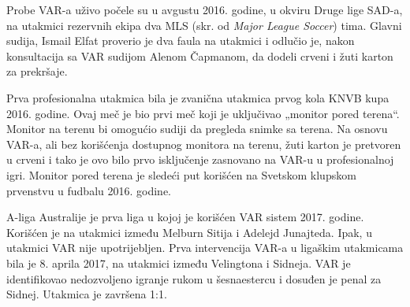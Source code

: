 \documentclass[a4paper]{article}
\begin{document}
Probe VAR-a uživo počele su u avgustu 2016. godine, u okviru Druge lige SAD-a, na utakmici rezervnih ekipa dva MLS (skr. od \emph{Major League Soccer}) tima. Glavni sudija, Ismail Elfat proverio je dva faula na utakmici i odlučio je, nakon konsultacija sa VAR sudijom Alenom Čapmanom, da dodeli crveni i žuti karton za prekršaje.

Prva profesionalna utakmica bila je zvanična utakmica prvog kola KNVB kupa 2016. godine. Ovaj meč je bio prvi meč koji je uključivao „monitor pored terena“. Monitor na terenu bi omogućio sudiji da pregleda snimke sa terena. Na osnovu VAR-a, ali bez korišćenja dostupnog monitora na terenu, žuti karton je pretvoren u crveni i tako je ovo bilo prvo isključenje zasnovano na VAR-u u profesionalnoj igri. Monitor pored terena je sledeći put korišćen na Svetskom klupskom prvenstvu u fudbalu 2016. godine.

A-liga Australije je prva liga u kojoj je korišćen VAR sistem 2017. godine. Korišćen je na utakmici između Melburn Sitija i Adelejd Junajteda. Ipak, u utakmici VAR nije upotrijebljen. Prva intervencija VAR-a u ligaškim utakmicama bila je 8. aprila 2017, na utakmici između Velingtona i Sidneja. VAR je identifikovao nedozvoljeno igranje rukom u šesnaestercu i dosuđen je penal za Sidnej. Utakmica je završena 1:1.
\end{document}

